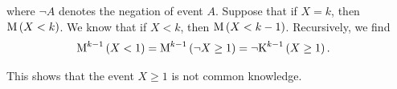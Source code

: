 \begin{enumerate}[label=\alph*.]
  where $\neg A$ denotes the negation of event $A$. Suppose that if $X = k$, then $\text{M} \left(X < k\right)$.
  We know that if $X < k$, then $\text{M} \left(X < k-1\right)$. Recursively, we find
  \begin{align*}
      \text{M}^{k-1} \left(X < 1\right)
      &= \text{M}^{k-1} \left( \neg X \geq 1\right)
      = \neg \text{K}^{k-1} \left(X \geq 1\right).
  \end{align*}
  
  This shows that the event $X \geq 1$ is not common knowledge.
  
  
\end{enumerate}